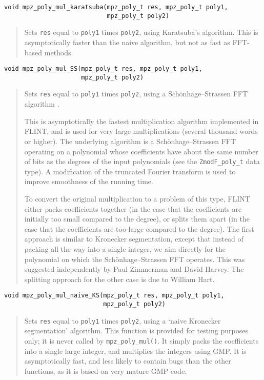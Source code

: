 \documentclass[a4paper,10pt]{article}
\newcommand{\code}{\lstinline}
\begin{document}
\begin{lstlisting}
void mpz_poly_mul_karatsuba(mpz_poly_t res, mpz_poly_t poly1,
                            mpz_poly_t poly2)
\end{lstlisting}
\begin{quote}
Sets \code{res} equal to \code{poly1} times \code{poly2}, using Karatsuba's algorithm. This is asymptotically faster than the naive algorithm, but not as fast as FFT-based methods.
\end{quote}

\begin{lstlisting}
void mpz_poly_mul_SS(mpz_poly_t res, mpz_poly_t poly1,
                     mpz_poly_t poly2)
\end{lstlisting}
\begin{quote}
Sets \code{res} equal to \code{poly1} times \code{poly2}, using a Sch\"onhage--Strassen FFT algorithm \cite{ss}.

This is asymptotically the fastest multiplication algorithm implemented in FLINT, and is used for very large multiplications (several thousand words or higher). The underlying algorithm is a Sch\"onhage--Strassen FFT operating on a polynomial whose coefficients have about the same number of bits as the degrees of the input polynomials (see the \code{ZmodF_poly_t} data type). A modification of the truncated Fourier transform \cite{tft} is used to improve smoothness of the running time.

To convert the original multiplication to a problem of this type, FLINT either packs coefficients together (in the case that the coefficients are initially too small compared to the degree), or splits them apart (in the case that the coefficients are too large compared to the degree). The first approach is similar to Kronecker segmentation, except that instead of packing all the way into a single integer, we aim directly for the polynomial on which the Sch\"onhage--Strassen FFT operates. This was suggested independently by Paul Zimmerman and David Harvey. The splitting approach for the other case is due to William Hart.
\end{quote}


\begin{lstlisting}
void mpz_poly_mul_naive_KS(mpz_poly_t res, mpz_poly_t poly1,
                           mpz_poly_t poly2)
\end{lstlisting}
\begin{quote}
Sets \code{res} equal to \code{poly1} times \code{poly2}, using a `naive Kronecker segmentation' algorithm. This function is provided for testing purposes only; it is never called by \code{mpz_poly_mul()}. It simply packs the coefficients into a single large integer, and multiplies the integers using GMP. It is asymptotically fast, and less likely to contain bugs than the other functions, as it is based on very mature GMP code.
\end{quote}
\end{document}
